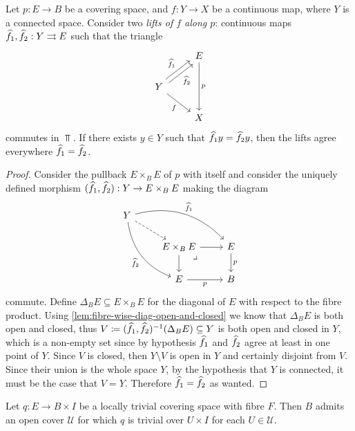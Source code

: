 \begin{theorem}
\label{thm:lifting-out-of-connected-space}
Let \(p: E \to B\) be a covering space, and \(f: Y \to X\) be a continuous map,
where \(Y\) is a connected space. Consider two \emph{lifts of \(f\) along
  \(p\)}: continuous maps \(\widehat f_1, \widehat f_2: Y \rightrightarrows E\) such that
the triangle
\[
\begin{tikzcd}
&E \ar[dd, "p"] \\
Y \ar[ru, shift left, "\lift f_1"]
\ar[ru, shift right, "\lift f_2"']
\ar[dr, "f"']
&
\\
&X
\end{tikzcd}
\]
commutes in \(\Top\). If there exists \(y \in Y\) such that
\(\widehat f_1 y = \widehat f_2 y\), then the lifts agree everywhere
\(\widehat f_1 = \widehat f_2\).
\end{theorem}

\begin{proof}
Consider the pullback \(E \times_B E\) of \(p\) with itself and consider the
uniquely defined morphism \((\widehat f_1, \widehat f_2): Y \to E \times_B E\)
making the diagram
\[
\begin{tikzcd}
Y \ar[rrd, bend left, "\lift{f}_1"]
\ar[ddr, "\lift{f}_2"', bend right]
\ar[rd, dashed]
& &
\\
&E \times_B E \ar[r] \ar[d]
\ar[rd, phantom, "\lrcorner", very near start]
&E \ar[d, "p"]
\\
&E \ar[r, "p"']
&B
\end{tikzcd}
\]
commute. Define \(\Delta_B E \subseteq E \times_B E\) for the diagonal of \(E\)
with respect to the fibre product. Using
\cref{lem:fibre-wise-diag-open-and-closed} we know that \(\Delta_B E\) is both
open and closed, thus
\(V \coloneq (\widehat f_1, \widehat f_2)^{-1}(\Delta_B E) \subseteq Y\) is both
open and closed in \(Y\), which is a non-empty set since by hypothesis
\(\widehat f_1\) and \(\widehat f_2\) agree at least in one point of
\(Y\). Since \(V\) is closed, then \(Y \setminus V\) is open in \(Y\) and
certainly disjoint from \(V\). Since their union is the whole space \(Y\), by
the hypothesis that \(Y\) is connected, it must be the case that \(V =
Y\). Therefore \(\widehat f_1 = \widehat f_2\) as wanted.
\end{proof}

\begin{proposition}
Let \(q: E \to B \times I\) be a locally trivial covering space with
fibre \(F\). Then \(B\) admits an open cover \(\mathcal{U}\) for which \(q\) is
trivial over \(U \times I\) for each \(U \in \mathcal{U}\).
\end{proposition}

